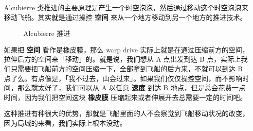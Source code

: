 \documentclass[letterpaper,10pt]{sphinxmanual}
\begin{document}
Alcubierre 类推进的主要原理是产生一个时空泡泡，然后通过移动这个时空泡泡来移动飞船。其实就是通过操控 \textbf{空间} 来从一个地方移动到另一个地方的推进技术。
\begin{figure}[htbp]
\centering
\capstart
\caption{Alcubierre 推进}\end{figure}

如果把 \textbf{空间} 看作是橡皮膜，那么 warp drive 实际上就是在通过压缩前方的空间，拉伸后方的空间来「移动」的。就是说，我们想从 A 点出发到达 B 点，实际上我们只需要把飞船前方的空间压缩一下，全部拿到飞船的后方来，不就可以到达 B 点了么。有点像是，「我不过去，山会过来」。如果我们仅仅操控空间，而不影响时间，那么就太好了，我们可以从 A 以任意 \textbf{速度} 到达 B 地点，但是总会花费一点时间，因为我们把空间这块 \textbf{橡皮膜} 压缩起来或者伸展开去总需要一定的时间吧。

这种推进有种很大的优势，那就是飞船里面的人不会察觉到飞船移动状况的改变，因为局域的来看，我们实际上根本没动。
\end{document}
